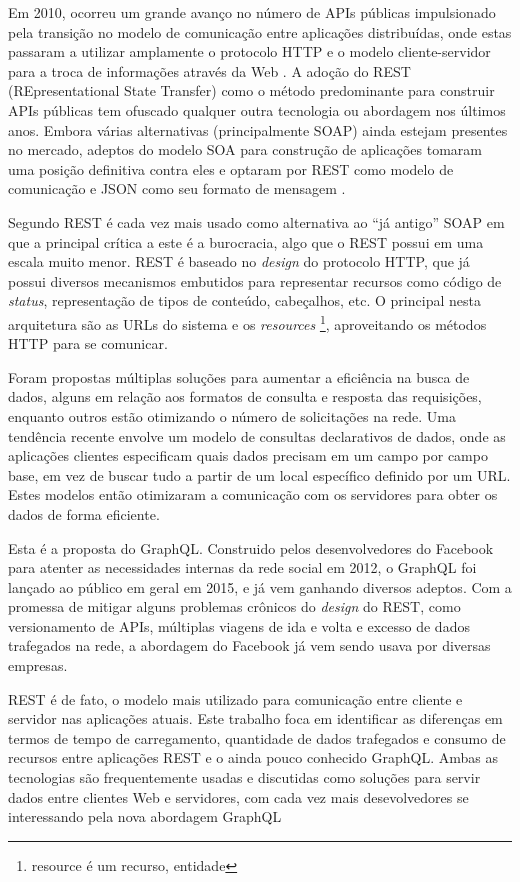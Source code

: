 Em 2010, ocorreu um grande avanço no número de APIs públicas impulsionado pela transição no modelo de comunicação entre aplicações distribuídas, onde estas passaram a utilizar amplamente o protocolo HTTP e o modelo cliente-servidor para a troca de informações através da Web \cite{tcc-ufsc}. A adoção do REST (REpresentational State Transfer) como o método predominante para construir APIs públicas tem ofuscado qualquer outra tecnologia ou abordagem nos últimos anos. Embora várias alternativas (principalmente SOAP) ainda estejam presentes no mercado, adeptos do modelo SOA para construção de aplicações tomaram uma posição definitiva contra eles e optaram por REST como modelo de comunicação e JSON como seu formato de mensagem \cite{programmableweb-rest-losing}.

Segundo  REST é cada vez mais usado como alternativa ao “já antigo” SOAP em que a principal crítica a este é a burocracia, algo que o REST possui em uma escala muito menor. REST é baseado no \textit{design} do protocolo HTTP, que já possui diversos mecanismos embutidos para representar recursos como código de \textit{status}, representação de tipos de conteúdo, cabeçalhos, etc. O principal nesta arquitetura são as URLs do sistema e os \textit{resources} \footnote{resource é um recurso, entidade}, aproveitando os métodos HTTP para se comunicar.

Foram propostas múltiplas soluções para aumentar a eficiência na busca de dados, alguns em relação aos formatos de consulta e resposta das requisições, enquanto outros estão otimizando o número de solicitações na rede. Uma tendência recente envolve um modelo de consultas declarativos de dados, onde as aplicações clientes especificam quais dados precisam em um campo por campo base, em vez de buscar tudo a partir de um local específico definido por um URL. Estes modelos então otimizaram a comunicação com os servidores para obter os dados de forma eficiente.

Esta é a proposta do GraphQL. Construido pelos desenvolvedores do Facebook para atenter as necessidades internas da rede social em 2012, o GraphQL foi lançado ao público em geral em 2015, e já vem ganhando diversos adeptos. Com a promessa de mitigar alguns problemas crônicos do \textit{design} do REST, como versionamento de APIs, múltiplas viagens de ida e volta e excesso de dados trafegados na rede, a abordagem do Facebook já vem sendo usava por diversas empresas.

REST é de fato, o modelo mais utilizado para comunicação entre cliente e servidor nas aplicações atuais. Este trabalho foca em identificar as diferenças em termos de tempo de carregamento, quantidade de dados trafegados e consumo de recursos entre aplicações REST e o ainda pouco conhecido GraphQL. Ambas as tecnologias são frequentemente usadas e discutidas como soluções para servir dados entre clientes Web e servidores, com cada vez mais desevolvedores se interessando pela nova abordagem GraphQL

